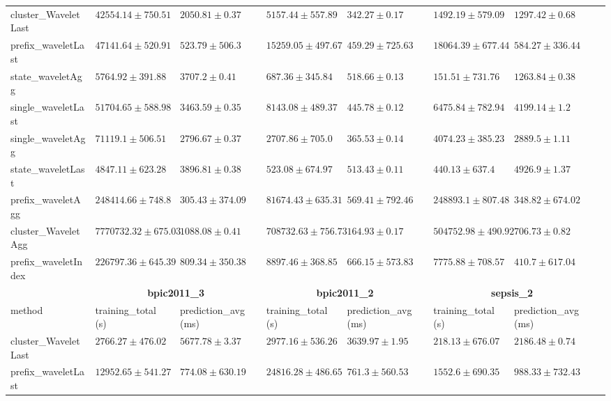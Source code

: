 \documentclass[twoside,11pt]{Latex/Classes/PhDthesisPSnPDF}
\begin{document}
\begin{table}[h]
{\begin{tabular}{llllllll}
				cluster\_WaveletLast & $42554.14 \pm 750.51$ & $2050.81 \pm 0.37$ & $5157.44 \pm 557.89$ & $342.27 \pm 0.17$ & $1492.19 \pm 579.09$ & $1297.42 \pm 0.68$ \\ 
				prefix\_waveletLast & $47141.64 \pm 520.91$ & $523.79 \pm 506.3$ & $15259.05 \pm 497.67$ & $459.29 \pm 725.63$ & $18064.39 \pm 677.44$ & $584.27 \pm 336.44$ \\ 
				state\_waveletAgg & $5764.92 \pm 391.88$ & $3707.2 \pm 0.41$ & $687.36 \pm 345.84$ & $518.66 \pm 0.13$ & $\mathbf{151.51 \pm 731.76}$ & $1263.84 \pm 0.38$ \\ 
				single\_waveletLast & $51704.65 \pm 588.98$ & $3463.59 \pm 0.35$ & $8143.08 \pm 489.37$ & $445.78 \pm 0.12$ & $6475.84 \pm 782.94$ & $4199.14 \pm 1.2$ \\ 
				single\_waveletAgg & $71119.1 \pm 506.51$ & $2796.67 \pm 0.37$ & $2707.86 \pm 705.0$ & $365.53 \pm 0.14$ & $4074.23 \pm 385.23$ & $2889.5 \pm 1.11$ \\ 
				state\_waveletLast & $\mathbf{4847.11 \pm 623.28}$ & $3896.81 \pm 0.38$ & $\mathbf{523.08 \pm 674.97}$ & $513.43 \pm 0.11$ & $440.13 \pm 637.4$ & $4926.9 \pm 1.37$ \\ 
				prefix\_waveletAgg & $248414.66 \pm 748.8$ & $\mathbf{305.43 \pm 374.09}$ & $81674.43 \pm 635.31$ & $569.41 \pm 792.46$ & $248893.1 \pm 807.48$ & $\mathbf{348.82 \pm 674.02}$ \\ 
				cluster\_WaveletAgg & $7770732.32 \pm 675.03$ & $1088.08 \pm 0.41$ & $708732.63 \pm 756.73$ & $\mathbf{164.93 \pm 0.17}$ & $504752.98 \pm 490.92$ & $706.73 \pm 0.82$ \\ 
				prefix\_waveletIndex & $226797.36 \pm 645.39$ & $809.34 \pm 350.38$ & $8897.46 \pm 368.85$ & $666.15 \pm 573.83$ & $7775.88 \pm 708.57$ & $410.7 \pm 617.04$ \\ 
				\bottomrule
				\toprule
				& \multicolumn{2}{c}{{\bfseries bpic2011\_3}} & \multicolumn{2}{c}{{\bfseries bpic2011\_2}} & \multicolumn{2}{c}{{\bfseries sepsis\_2}} \\ \cmidrule(lr){2-3} \cmidrule(lr){4-5} \cmidrule(lr){6-7}
				method  & training\_total (s) & prediction\_avg (ms) & training\_total (s) & prediction\_avg (ms) & training\_total (s) & prediction\_avg (ms) \\ \midrule
				cluster\_WaveletLast & $2766.27 \pm 476.02$ & $5677.78 \pm 3.37$ & $2977.16 \pm 536.26$ & $3639.97 \pm 1.95$ & $218.13 \pm 676.07$ & $2186.48 \pm 0.74$ \\ 
				prefix\_waveletLast & $12952.65 \pm 541.27$ & $774.08 \pm 630.19$ & $24816.28 \pm 486.65$ & $761.3 \pm 560.53$ & $1552.6 \pm 690.35$ & $988.33 \pm 732.43$ \\ 

\end{tabular}}
\end{table}
\end{document}

